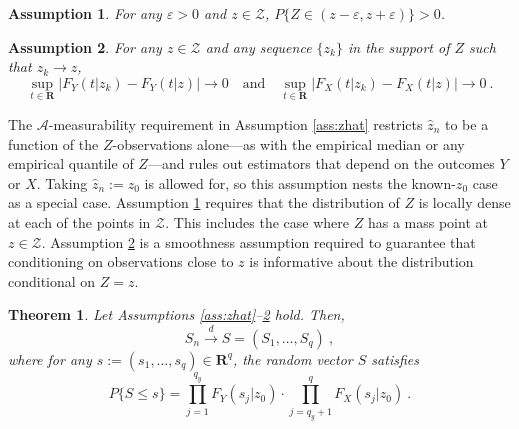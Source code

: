\documentclass[11pt]{article}
\numberwithin{equation}{section}
\newtheorem{theorem}{Theorem}%
\newtheorem{assumption}{Assumption}%
\begin{document}
\begin{assumption}\label{ass:Z}
For any $\varepsilon >0$ and $z\in \mathcal{Z}$, $P\{Z\in (z-\varepsilon ,z+\varepsilon )\}>0$.
  \end{assumption}

\begin{assumption}\label{ass:cond-continuous}
    For any $z\in\mathcal Z$ and any sequence $\{z_k\}$ in the support of $Z$ such that $z_k\to z$,
    \[
    \sup_{t\in\mathbf R}\big|F_Y(t| z_k)-F_Y(t| z)\big|\to 0
    \quad\text{and}\quad
    \sup_{t\in\mathbf R}\big|F_X(t| z_k)-F_X(t| z)\big|\to 0~.
    \]
  \end{assumption}

The $\mathcal A$-measurability requirement in Assumption \ref{ass:zhat} restricts $\hat z_n$ to be a function of the $Z$-observations alone---as with the empirical median or any empirical quantile of $Z$---and rules out estimators that depend on the outcomes $Y$ or $X$. Taking $\hat z_n:= z_0$ is allowed for, so this assumption nests the known-$z_0$ case as a special case. Assumption \ref{ass:Z} requires that the distribution of $Z$ is locally dense at each of the points in $\mathcal{Z}$. This includes the case where $Z$ has a mass point at $z\in \mathcal Z$. Assumption \ref{ass:cond-continuous} is a smoothness assumption required to guarantee that conditioning on observations close to $z$ is informative about the distribution conditional on $Z=z$.

\begin{theorem}\label{thm:limit-Sn}
Let Assumptions \ref{ass:zhat}--\ref{ass:cond-continuous} hold. Then,
    \begin{equation}\label{eq:limit-Sn}
          S_n \stackrel{d}{\to} S=(S_1,\dots,S_{q})~,
    \end{equation}
    where for any $s:=(s_1,\dots,s_{q})\in \mathbf{R}^{q}$, the random vector $S$ satisfies
  \begin{equation*}
   P\{S\le s\} = \prod_{j=1}^{q_y} F_Y(s_j|z_{0}) \cdot \prod_{j=q_y+1}^{q} F_X(s_j|z_{0})~.
  \end{equation*}
\end{theorem}
\end{document}

